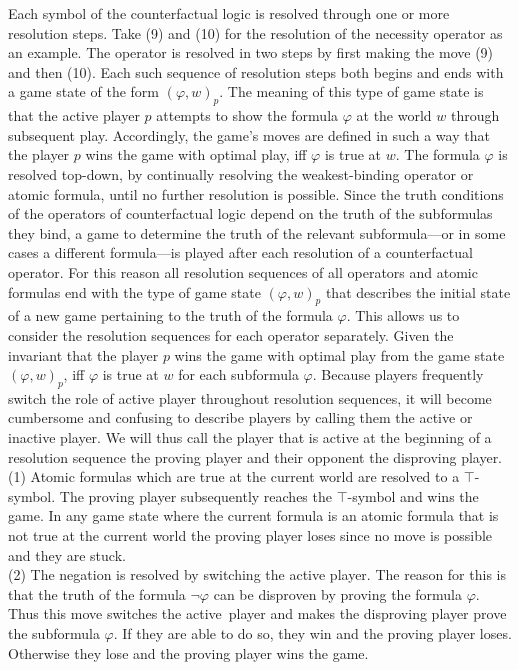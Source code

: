 \documentclass[a4paper,american,10pt]{paper}
\theoremstyle{definition}\newtheorem{definition}{Definition}
\begin{document}
\noindent Each symbol of the counterfactual logic is resolved through one or more resolution steps. Take (9) and (10) for the resolution of the necessity operator as an example. The operator is resolved in two steps by first making the move (9) and then (10). Each such sequence of resolution steps both begins and ends with a game state of the form $(\varphi ,w)_p$. The meaning of this type of game state is that the active player $p$ attempts to show the formula $\varphi$ at the world $w$ through subsequent play. Accordingly, the game's moves are defined in such a way that the player $p$ wins the game with optimal play, iff $\varphi$ is true at $w$. The formula $\varphi$ is resolved top-down, by continually resolving the weakest-binding operator or atomic formula, until no further resolution is possible. Since the truth conditions of the operators of counterfactual logic depend on the truth of the subformulas they bind, a game to determine the truth of the relevant subformula---or in some cases a different formula---is played after each resolution of a counterfactual operator. For this reason all resolution sequences of all operators and atomic formulas end with the type of game state $(\varphi ,w)_p$ that describes the initial state of a new game pertaining to the truth of the formula $\varphi$. This allows us to consider the resolution sequences for each operator separately. Given the invariant that the player $p$ wins the game with optimal play from the game state $(\varphi ,w)_p$, iff $\varphi$ is true at $w$ for each subformula $\varphi$. Because players frequently switch the role of active player throughout resolution sequences, it will become cumbersome and confusing to describe players by calling them the active or inactive player. We will thus call the player that is active at the beginning of a resolution sequence the proving player and their opponent the disproving player.\\
\indent (1) Atomic formulas which are true at the current world are resolved to a $\top$-symbol. The proving player subsequently reaches the $\top$-symbol and wins the game. In any game state where the current formula is an atomic formula that is not true at the current world the proving player loses since no move is possible and they are stuck.\\
\indent (2) The negation is resolved by switching the active player. The reason for this is that the truth of the formula $\neg\varphi$ can be disproven by proving the formula $\varphi$. Thus this move switches the active~player and makes the disproving player prove the subformula $\varphi$. If they are able to do so, they win and the proving player loses. Otherwise they lose and the proving player wins the game.\\
\end{document}
